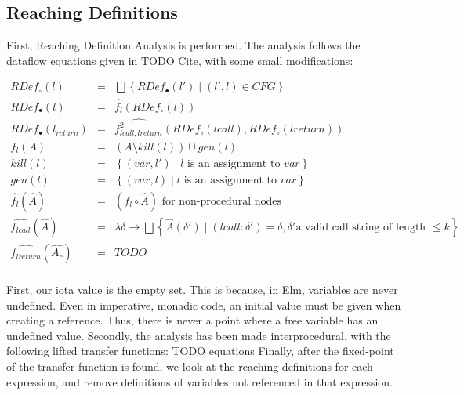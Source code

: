 \documentclass{article}
\newcommand\set[1]{\left\{#1\right\}}
\newcommand\sst[0]{\mid}
\begin{document}
\subsection{Reaching Definitions}

First, Reaching Definition Analysis is performed. The analysis follows the dataflow equations given in TODO Cite, with some small modifications:

\begin{eqnarray}
 RDef_{\circ}(l) & = & \bigsqcup \set{RDef_\bullet(l') \sst (l',l) \in CFG} 
        \nonumber \\
    RDef_{\bullet}(l) & = &  \hat{f_l}(RDef_\circ(l))  \nonumber \\
    RDef_{\bullet}(l_{return}) & = 
      &  \hat{f^2_{lcall, lreturn}}(RDef_\circ(lcall), RDef_\circ(lreturn))  \nonumber \\
    {f_l}(A) & = & (A \setminus kill(l)) \cup gen(l) \nonumber \\
   kill(l) & = & \set{(var, l') \sst l \text{ is an assignment to } var } \nonumber \\
   gen(l) & = & \set{(var, l) \sst l \text{ is an assignment to } var } \nonumber \\
   \hat{f_l}(\hat{A}) & = &  (f_l \circ \hat{A}) \text{ for non-procedural nodes }\nonumber \\
   \hat{f_{lcall}}(\hat{A}) & = & \lambda \delta \rightarrow
       \bigsqcup \set{\hat{A}(\delta') \sst (lcall : \delta') = \delta, \delta' \text{a valid call string of length } \leq k } \nonumber \\
   \hat{f_{lreturn}}(\hat{A_c}) & = &  TODO  \nonumber \\
\end{eqnarray}
%      


First, our iota value is the empty set. This is because, in Elm, variables are never undefined. Even in imperative, monadic code, an initial value must be given when creating a reference.
Thus, there is never a point where a free variable has an undefined value. Secondly, the analysis has been made interprocedural, with the following lifted transfer functions: TODO equations Finally, after the fixed-point of the transfer function is found, we look at the reaching definitions for each expression, and remove definitions of variables not referenced in that expression.
\end{document}
